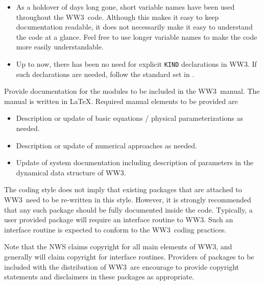 \documentclass[12pt]{article}
\newcommand{\ws}{WW3}
\newcommand{\code}{\tt}
\newcounter{mylistno}
\begin{document}
\begin{list}{)}{ \rightmargin 8mm
                                \leftmargin 10mm }
\begin{itemize}
\item As a holdover of days long gone, short variable names have been used
      throughout the \ws\ code. Although this makes it easy to keep
      documentation readable, it does not necessarily make it easy to
      understand the code at a glance. Feel free to use longer variable names
      to make the code more easily understandable.
\item Up to now, there has been no need for explicit {\code KIND} declarations
      in \ws. If such declarations are needed, follow the standard set in
      \cite{rep:PvD08}.
\end{itemize}

\item Provide documentation for the modules to be included in the \ws\
      manual. The manual is written in \LaTeX. Required manual elements to be
      provided are

\begin{itemize}
\item Description or update of basic equations / physical parameterizations as
      needed.
\item Description or update of numerical approaches as needed.
\item Update of system documentation including description of parameters in
      the dynamical data structure of \ws.
\end{itemize}

\end{list}

\noindent
The coding style does not imply that existing packages that are attached to
\ws\ need to be re-written in this style. However, it is strongly recommended
that any such package should be fully documented inside the code. Typically, a
user provided package will require an interface routine to \ws. Such an
interface routine is expected to conform to the \ws\ coding practices.

Note that the NWS claims copyright for all main elements of \ws, and generally
will claim copyright for interface routines. Providers of packages to be
included with the distribution of \ws\ are encourage to provide copyright
statements and disclaimers in these packages as appropriate. 
\end{document}
